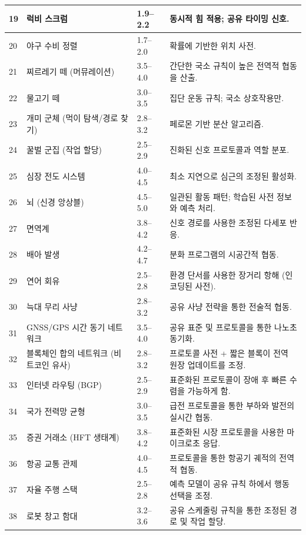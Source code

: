\documentclass[13pt,a4paper]{article}
\begin{document}
\begin{longtable}{|p{0.8cm}|p{6.2cm}|p{3.0cm}|p{5.7cm}|}
		\hline
		19 & 럭비 스크럼 & 1.9--2.2 & 동시적 힘 적용; 공유 타이밍 신호. \\
		\hline
		20 & 야구 수비 정렬 & 1.7--2.0 & 확률에 기반한 위치 사전. \\
		\hline
		21 & 찌르레기 떼 (머뮤레이션) & 3.5--4.0 & 간단한 국소 규칙이 높은 전역적 협동을 산출. \\
		\hline
		22 & 물고기 떼 & 3.0--3.5 & 집단 운동 규칙; 국소 상호작용만. \\
		\hline
		23 & 개미 군체 (먹이 탐색/경로 찾기) & 2.8--3.2 & 페로몬 기반 분산 알고리즘. \\
		\hline
		24 & 꿀벌 군집 (작업 할당) & 2.5--2.9 & 진화된 신호 프로토콜과 역할 분포. \\
		\hline
		25 & 심장 전도 시스템 & 4.0--4.5 & 최소 지연으로 심근의 조정된 활성화. \\
		\hline
		26 & 뇌 (신경 앙상블) & 4.5--5.0 & 일관된 활동 패턴; 학습된 사전 정보와 예측 처리. \\
		\hline
		27 & 면역계 & 3.8--4.2 & 신호 경로를 사용한 조정된 다세포 반응. \\
		\hline
		28 & 배아 발생 & 4.2--4.7 & 분화 프로그램의 시공간적 협동. \\
		\hline
		29 & 연어 회유 & 2.5--2.8 & 환경 단서를 사용한 장거리 항해 (인코딩된 사전). \\
		\hline
		30 & 늑대 무리 사냥 & 2.8--3.2 & 공유 사냥 전략을 통한 전술적 협동. \\
		\hline
		31 & GNSS/GPS 시간 동기 네트워크 & 3.5--4.0 & 공유 표준 및 프로토콜을 통한 나노초 동기화. \\
		\hline
		32 & 블록체인 합의 네트워크 (비트코인 유사) & 2.8--3.2 & 프로토콜 사전 + 짧은 블록이 전역 원장 업데이트를 조정. \\
		\hline
		33 & 인터넷 라우팅 (BGP) & 2.5--2.9 & 표준화된 프로토콜이 장애 후 빠른 수렴을 가능하게 함. \\
		\hline
		34 & 국가 전력망 균형 & 3.0--3.5 & 급전 프로토콜을 통한 부하와 발전의 실시간 협동. \\
		\hline
		35 & 증권 거래소 (HFT 생태계) & 3.8--4.2 & 표준화된 시장 프로토콜을 사용한 마이크로초 응답. \\
		\hline
		36 & 항공 교통 관제 & 4.0--4.5 & 프로토콜을 통한 항공기 궤적의 전역적 협동. \\
		\hline
		37 & 자율 주행 스택 & 2.5--2.8 & 예측 모델이 공유 규칙 하에서 행동 선택을 조정. \\
		\hline
		38 & 로봇 창고 함대 & 3.2--3.6 & 공유 스케줄링 규칙을 통한 조정된 경로 및 작업 할당. \\

\end{longtable}
\end{document}
